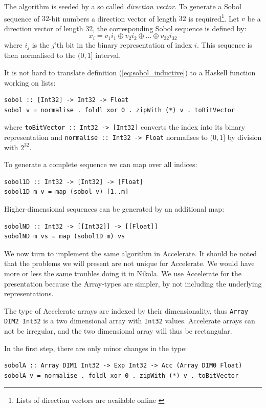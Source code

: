 \documentclass{llncs2e/llncs}
\begin{document}
The algorithm is seeded by a so called \emph{direction vector}. To
generate a Sobol sequence of $32$-bit numbers a direction vector of
length $32$ is required\footnote{Lists of direction vectors are available
online \cite{homepage:sobol:directionvectors}}. Let $v$ be a direction
vector of length $32$, the corresponding Sobol sequence is defined by:
\begin{equation}
x_i = v_1i_1 \oplus v_2i_2 \oplus \ldots \oplus v_{32}i_{32}\label{eq:sobol_inductive}
\end{equation}
where $i_j$ is the $j$'th bit in the binary representation of index
$i$. This sequence is then normalised to the $(0,1]$ interval.

It is not hard to translate definition (\ref{eq:sobol_inductive}) to a
Haskell function working on lists:
\begin{verbatim}
sobol :: [Int32] -> Int32 -> Float
sobol v = normalise . foldl xor 0 . zipWith (*) v . toBitVector
\end{verbatim}
where \verb|toBitVector :: Int32 -> [Int32]| converts the index into
its binary representation and \verb|normalise :: Int32 -> Float|
normalises to $(0,1]$ by division with $2^{32}$.

To generate a complete sequence we can map over all indices:
\begin{verbatim}
sobol1D :: Int32 -> [Int32] -> [Float]
sobol1D m v = map (sobol v) [1..m]
\end{verbatim}
Higher-dimensional sequences can be generated by an additional map:
\begin{verbatim}
sobolND :: Int32 -> [[Int32]] -> [[Float]]
sobolND m vs = map (sobol1D m) vs
\end{verbatim}

We now turn to implement the same algorithm in Accelerate. It should
be noted that the problems we will present are not unique for
Accelerate. We would have more or less the same troubles doing it in
Nikola. We use Accelerate for the presentation because the Array-types
are simpler, by not including the underlying representations.

The type of Accelerate arrays are indexed by their dimensionality,
thus \verb|Array DIM2 Int32| is a two dimensional array with
\verb|Int32| values. Accelerate arrays can not be irregular, and the
two dimensional array will thus be rectangular.

In the first step, there are only minor changes in the type:
\begin{verbatim}
sobolA :: Array DIM1 Int32 -> Exp Int32 -> Acc (Array DIM0 Float)
sobolA v = normalise . foldl xor 0 . zipWith (*) v . toBitVector
\end{verbatim}
\end{document}

